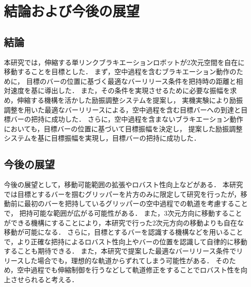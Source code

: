 \chapter[結論および今後の展望]%
{結論および今後の展望}
        \section{結論}

        本研究では，伸縮する単リンクブラキエーションロボットが2次元空間を自在に移動することを目標とした．
        まず，空中過程を含むブラキエーション動作のために，
        目標のバーの位置に基づく最適なバーリリース条件を把持時の距離と相対速度を基に導出した．
        また，その条件を実現させるために必要な振幅を求め，伸縮する機構を活かした励振調整システムを提案し，
        実機実験により励振調整を用いた最適なバーリリースによる，空中過程を含む目標バーへの到達と目標バーの把持に成功した．
        さらに，空中過程を含まないブラキエーション動作においても，目標バーの位置に基づいて目標振幅を決定し，
        提案した励振調整システムを基に目標振幅を実現し，目標バーの把持に成功した．

          

        \section{今後の展望}
        
        今後の展望として，移動可能範囲の拡張やロバスト性向上などがある．
        本研究では目標とするバーを掴むグリッパーを片方のみに限定して研究を行ったが，移動前に最初のバーを把持しているグリッパーの空中過程での軌道を考慮することで，
        把持可能な範囲が広がる可能性がある．
        また，3次元方向に移動することができる機構にすることにより，本研究で行った2次元方向の移動よりも自在な移動が可能になる．
        さらに，目標とするバーを認識する機構などを用いることで，より正確な把持によるロバスト性向上やバーの位置を認識して自律的に移動することも期待できる．
        また，本研究で提案した最適なバーリリース条件でリリースした場合でも，理想的な軌道からずれてしまう可能性がある．
        そのため，空中過程でも伸縮制御を行うなどして軌道修正をすることでロバスト性を向上させられると考える．
